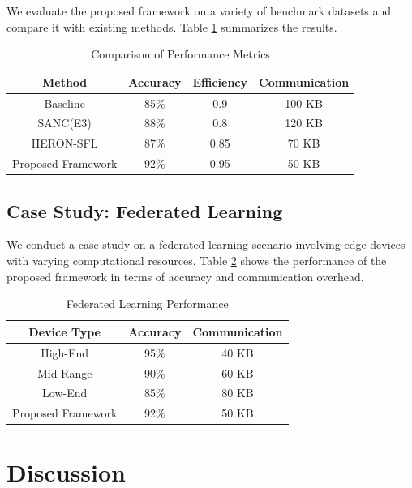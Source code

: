 \documentclass{article}
\begin{document}
We evaluate the proposed framework on a variety of benchmark datasets and compare it with existing methods. Table \ref{tab:performance} summarizes the results.

\begin{table}[ht]
    \centering
    \caption{Comparison of Performance Metrics}
    \label{tab:performance}
    \begin{tabular}{|c|c|c|c|}
        \hline
        Method & Accuracy & Efficiency & Communication \\
        \hline
        Baseline & 85\% & 0.9 & 100 KB \\
        SANC(E3) & 88\% & 0.8 & 120 KB \\
        HERON-SFL & 87\% & 0.85 & 70 KB \\
        Proposed Framework & 92\% & 0.95 & 50 KB \\
        \hline
    \end{tabular}
\end{table}

\subsection{Case Study: Federated Learning}
\label{subsec:case_study_federated}

We conduct a case study on a federated learning scenario involving edge devices with varying computational resources. Table \ref{tab:federated} shows the performance of the proposed framework in terms of accuracy and communication overhead.

\begin{table}[ht]
    \centering
    \caption{Federated Learning Performance}
    \label{tab:federated}
    \begin{tabular}{|c|c|c|}
        \hline
        Device Type & Accuracy & Communication \\
        \hline
        High-End & 95\% & 40 KB \\
        Mid-Range & 90\% & 60 KB \\
        Low-End & 85\% & 80 KB \\
        Proposed Framework & 92\% & 50 KB \\
        \hline
    \end{tabular}
\end{table}

\section{Discussion}
\label{sec:discussion}
\end{document}
